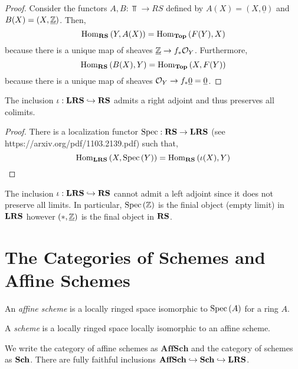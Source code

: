 \documentclass[12pt]{article}
\begin{document}
\begin{proof}
Consider the functors $A, B : \Top \to RS$ defined by $A(X) = (X, \underline{0})$ and $B(X) = (X, \underline{\mathbb{Z}})$. Then,
\[ \mathrm{Hom}_{\mathbf{RS}} \left( Y, A(X) \right) = \mathrm{Hom}_{\mathbf{Top}} \left( F(Y), X \right) \]
because there is a unique map of sheaves $\underline{\mathbb{Z}} \to f_* \mathcal{O}_{Y}$. Furthermore,
\[ \mathrm{Hom}_{\mathbf{RS}} \left( B(X), Y \right) = \mathrm{Hom}_{\mathbf{Top}} \left( X, F(Y) \right) \]
because there is a unique map of sheaves $\mathcal{O}_{Y} \to f_* \underline{0} = \underline{0}$.
\end{proof}

\begin{prop}
The inclusion $\iota : \mathbf{LRS} \hookrightarrow \mathbf{RS}$ admits a right adjoint and thus preserves all colimits.
\end{prop}

\begin{proof}
There is a localization functor $\mathrm{Spec} : \mathbf{RS} \to \mathbf{LRS}$ (see https://arxiv.org/pdf/1103.2139.pdf) such that,
\[ \mathrm{Hom}_{\mathbf{LRS}} \left( X, \mathrm{Spec}\left( Y \right) \right) = \mathrm{Hom}_{\mathbf{RS}} \left( \iota(X), Y \right) \]
\end{proof}

\begin{rmk}
The inclusion $\iota : \mathbf{LRS} \hookrightarrow \mathbf{RS}$ cannot admit a left adjoint since it does not preserve all limits. In particular, $\mathrm{Spec}\left( \mathbb{Z} \right)$ is the finial object (empty limit) in $\mathbf{LRS}$ however $(*, \underline{\mathbb{Z}})$ is the final object in $\mathbf{RS}$.
\end{rmk}

\section{The Categories of Schemes and Affine Schemes}

\begin{defn}
An \textit{affine scheme} is a locally ringed space isomorphic to $\mathrm{Spec}\left( A \right)$ for a ring $A$.
\end{defn}


\begin{defn}
A \textit{scheme} is a locally ringed space locally isomorphic to an affine scheme.
\end{defn}

\newcommand{\AffSch}{\mathbf{AffSch}}
\newcommand{\CRing}{\mathbf{CRing}}

\begin{rmk}
We write the category of affine schemes as $\AffSch$ and the category of schemes as $\mathbf{Sch}$. There are fully faithful inclusions $\AffSch \embed \Sch \embed \LRS$.
\end{rmk}
\end{document}
